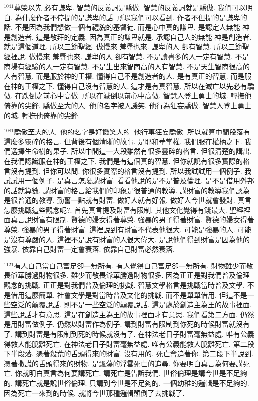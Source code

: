 \documentclass{book}
\begin{document}
$^{1041}$尊榮以先 必有謙卑.
智慧的反義詞是驕傲.
智慧的反義詞就是驕傲.
我們可以明白.
為什麼作者不停提的是謙卑的話.
所以我們可以看到.
作者不但提的是謙卑的話.
不是因為我們想做一個有禮貌的基督徒.
而是心中真的謙卑.
是認定人無能 神是創造者.
這是敬拜的定義.
因為真正的謙卑就是.
承認自己人的無能 神是創造者.
就是這個道理.
所以三節聖經.
傲慢來 羞辱也來.
謙卑的人 卻有智慧.
所以三節聖經裡說.
傲慢來 羞辱也來.
謙卑的人 卻有智慧.
不是讀書多的人一定有智慧.
不是商場有經驗的人一定有智慧.
不是生出來智商高的人有智慧.
不是天生智商很高的人有智慧.
而是服於神的王權.
懂得自己不是創造者的人.
是有真正的智慧.
而是服在神的王權之下.
懂得自己沒有智慧的人.
這才是有真智慧.
所以在滅亡以先必有驕傲.
在跌倒之前心中高傲.
所以在滅倒以前心中高傲.
智慧人登上勇士的城.
輕撫他倚靠的尖鋒.
驕傲至大的人.
他的名字被人譏笑.
他行為狂妄驕傲.
智慧人登上勇士的城.
輕撫他倚靠的尖鋒.

$^{1081}$驕傲至大的人.
他的名字是好譏笑人的.
他行事狂妄驕傲.
所以就算中間段落有這麼多靈碎的格言.
但背後有個清晰的故事.
是耶和華掌權.
我們服在權柄之下.
我們選擇生命樹的果子.
所以中間這一大段雖然有很多靈碎的格言.
但很清楚的講出.
在我們認識服在神的王權之下.
我們是有這個真的智慧.
但你就說有很多實際的格言沒有提到.
但你可以問.
你很多實際的格言沒有提到.
所以我試試用一個例子.
我試試用一個例子.
是真言怎麼講財富.
看看他說的是不是普及倫理.
是不是借用外邦的話就算數.
講財富的格言給我們的印象是很普通的教導.
講財富的教導我們認為是很普通的教導.
勤奮一點就有財富.
做好人就有好報.
做好人今世就會發財.
真言怎麼挑戰這些觀念呢?.
首先真言提及財富有限制.
其他文化覺得有錢最大.
聖經裡面真言說財富有限制.
賢德的婦女得著尊榮.
強暴的男子得著財富.
賢德的婦女得著尊榮.
強暴的男子得著財富.
這裡說到有財富不代表他很大.
可能是強暴的人.
可能是沒有尊嚴的人.
這裡不是說有財富的人很大偉大.
是說他們得到財富是因為他的強暴.
依靠自己財富一定會衰落.
依靠自己財富必然衰落.

$^{1121}$有人自己當自己富足卻一無所有.
有人覺得自己富足卻一無所有.
財物雖少而敬畏爺華勝過財物很多.
雖少而敬畏爺華勝過財物很多.
因為正正是對我們普及倫理觀念的挑戰.
正正是對我們普及倫理的挑戰.
智慧文學格言是挑戰當時普及文學.
不是借用這麼簡單.
社會文學是對當時普及文化的挑戰.
而不是單單借用.
但這不是一些空泛的顛覆說話.
則不是一些空泛的顛覆說話.
這是處於創造主為王的故事裡面.
這些說話才有意思.
這是在創造主為王的故事裡面才有意思.
我們看第二方面.
仍然是用財富做例子.
仍然以財富作為例子.
講到財富有限制到你死的時候財富就沒有了.
講到財富是有限制到死的時候就沒有了.
在神法老日子財富毫無益處.
唯有公義得救人能脫離死亡.
在神法老日子財富毫無益處.
唯有公義能救人脫離死亡.
第二段下半段落.
憑著殺荒的舌頭得來的財富.
沒有用的.
死亡會追著你.
第二段下半說到.
憑著撒謊的舌頭得來的財物.
是飄蕩的浮雲死亡的追尋.
你要明白真言為何要講死亡.
你就明白真言為何要講死亡.
講死亡是告訴我們.
世俗倫理是講今世是不足夠的.
講死亡就是說世俗倫理.
只講到今世是不足夠的.
一個幼稚的邏輯是不足夠的.
因為死亡一來到的時候.
就將今世那種邏輯顛倒了去挑戰了.
\end{document}
